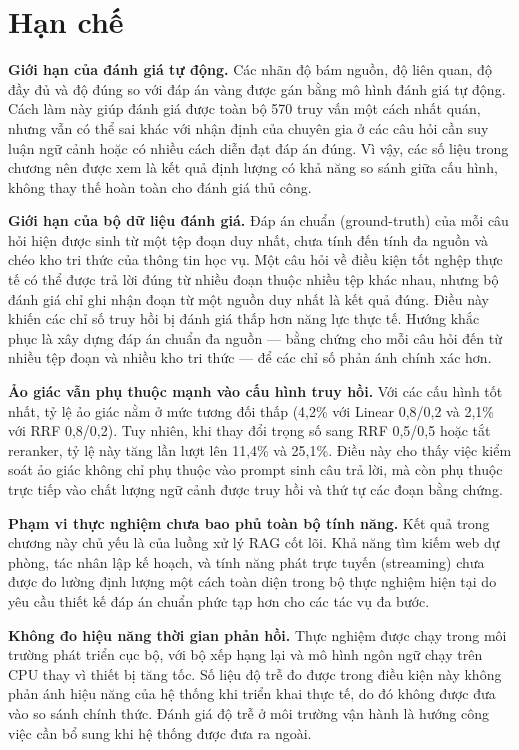 \documentclass[../DoAn.tex]{subfiles}
\begin{document}
\section{Hạn chế}

\textbf{Giới hạn của đánh giá tự động.} Các nhãn độ bám nguồn, độ liên quan,
độ đầy đủ và độ đúng so với đáp án vàng được gán bằng mô hình đánh giá tự động.
Cách làm này giúp đánh giá được toàn bộ 570 truy vấn một cách nhất quán, nhưng
vẫn có thể sai khác với nhận định của chuyên gia ở các câu hỏi cần suy luận
ngữ cảnh hoặc có nhiều cách diễn đạt đáp án đúng. Vì vậy, các số liệu trong
chương nên được xem là kết quả định lượng có khả năng so sánh giữa cấu hình,
không thay thế hoàn toàn cho đánh giá thủ công.

\textbf{Giới hạn của bộ dữ liệu đánh giá.} Đáp án chuẩn (ground-truth) của
mỗi câu hỏi hiện được sinh từ một tệp đoạn duy nhất, chưa tính đến tính đa
nguồn và chéo kho tri thức của thông tin học vụ. Một câu hỏi về điều kiện tốt
nghệp thực tế có thể được trả lời đúng từ nhiều đoạn thuộc nhiều tệp khác
nhau, nhưng bộ đánh giá chỉ ghi nhận đoạn từ một nguồn duy nhất là kết quả
đúng. Điều này khiến các chỉ số truy hồi bị đánh giá thấp hơn năng lực thực
tế. Hướng khắc phục là xây dựng đáp án chuẩn đa nguồn --- bằng chứng cho mỗi
câu hỏi đến từ nhiều tệp đoạn và nhiều kho tri thức --- để các chỉ số phản ánh
chính xác hơn.

\textbf{Ảo giác vẫn phụ thuộc mạnh vào cấu hình truy hồi.} Với các cấu hình
tốt nhất, tỷ lệ ảo giác nằm ở mức tương đối thấp (4,2\% với Linear 0,8/0,2 và
2,1\% với RRF 0,8/0,2). Tuy nhiên, khi thay đổi trọng số sang RRF 0,5/0,5 hoặc
tắt reranker, tỷ lệ này tăng lần lượt lên 11,4\% và 25,1\%. Điều này cho thấy
việc kiểm soát ảo giác không chỉ phụ thuộc vào prompt sinh câu trả lời, mà còn
phụ thuộc trực tiếp vào chất lượng ngữ cảnh được truy hồi và thứ tự các đoạn
bằng chứng.

\textbf{Phạm vi thực nghiệm chưa bao phủ toàn bộ tính năng.} Kết quả trong
chương này chủ yếu là của luồng xử lý RAG cốt lõi. Khả năng tìm kiếm web dự phòng, tác nhân lập kế hoạch, và tính năng phát trực tuyến (streaming) chưa được đo lường định lượng một cách toàn diện trong bộ thực nghiệm hiện tại do yêu cầu thiết kế đáp án chuẩn phức tạp hơn cho các tác vụ đa bước.

\textbf{Không đo hiệu năng thời gian phản hồi.} Thực nghiệm được chạy trong
môi trường phát triển cục bộ, với bộ xếp hạng lại và mô hình ngôn ngữ chạy
trên CPU thay vì thiết bị tăng tốc. Số liệu độ trễ đo được trong điều kiện này
không phản ánh hiệu năng của hệ thống khi triển khai thực tế, do đó không được
đưa vào so sánh chính thức. Đánh giá độ trễ ở môi trường vận hành là hướng công
việc cần bổ sung khi hệ thống được đưa ra ngoài.
\end{document}
